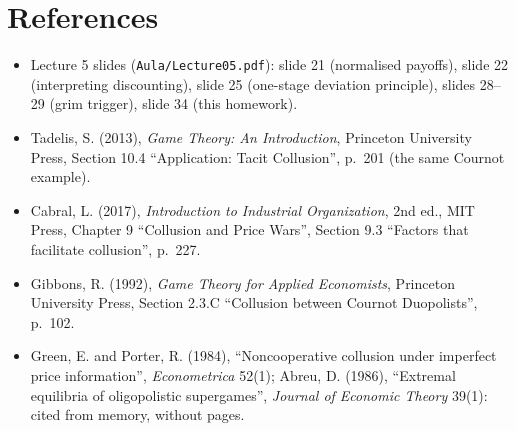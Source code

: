 \documentclass[11pt,a4paper]{article}
\begin{document}
\section*{References}
\begin{itemize}[leftmargin=1.4em]
\item Lecture 5 slides (\texttt{Aula/Lecture05.pdf}): slide 21 (normalised payoffs), slide 22 (interpreting
discounting), slide 25 (one-stage deviation principle), slides 28--29 (grim trigger), slide 34 (this homework).
\item Tadelis, S. (2013), \emph{Game Theory: An Introduction}, Princeton University Press,
Section 10.4 ``Application: Tacit Collusion'', p.~201 (the same Cournot example).
\item Cabral, L. (2017), \emph{Introduction to Industrial Organization}, 2nd ed., MIT Press, Chapter 9
``Collusion and Price Wars'', Section 9.3 ``Factors that facilitate collusion'', p.~227.
\item Gibbons, R. (1992), \emph{Game Theory for Applied Economists}, Princeton University Press,
Section 2.3.C ``Collusion between Cournot Duopolists'', p.~102.
\item Green, E. and Porter, R. (1984), ``Noncooperative collusion under imperfect price information'',
\emph{Econometrica} 52(1); Abreu, D. (1986), ``Extremal equilibria of oligopolistic supergames'',
\emph{Journal of Economic Theory} 39(1): cited from memory, without pages.
\end{itemize}
\end{document}
